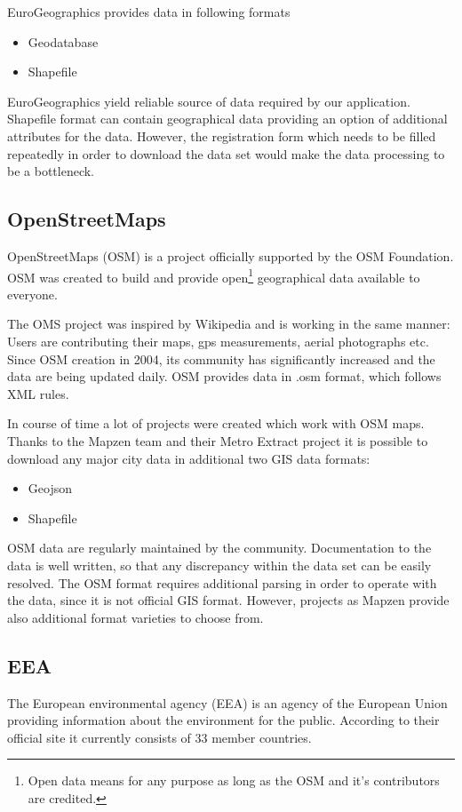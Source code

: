 \documentclass[thesis=M,english]{FITthesis}[2012/10/20]
\begin{document}
EuroGeographics provides data in following formats

\begin{itemize}
\item Geodatabase
\item Shapefile
\end{itemize}

EuroGeographics yield reliable source of data required by our application. Shapefile format can contain geographical data providing an option of additional attributes for the data. However, the registration form which needs to be filled repeatedly in order to download the data set would make the data processing to be a bottleneck.

\subsection{OpenStreetMaps}
\label{subsec:DA_OSM}
OpenStreetMaps (OSM) is a project officially supported by the OSM Foundation.
OSM was created to build and provide open\footnote{Open data means for any purpose as long as the OSM and it's contributors are credited.} geographical data available to everyone.  

The OMS project was inspired by Wikipedia and is working in the same manner: Users are contributing their maps, gps measurements, aerial photographs etc. Since OSM creation in 2004, its community has significantly increased and the data are being updated daily.
OSM provides data in .osm format, which follows XML rules.

In course of time a lot of projects were created which work with OSM maps.
Thanks to the Mapzen team and their Metro Extract project it is possible to download any major city data in additional two GIS data formats:
\begin{itemize}
\item Geojson
\item Shapefile
\end{itemize}

OSM data are regularly maintained by the community. Documentation to the data is well written, so that any discrepancy within the data set can be easily resolved. The OSM format requires additional parsing in order to operate with the data, since it is not official GIS format. However, projects as Mapzen provide also additional format varieties to choose from.

\subsection{EEA}
The European environmental agency (EEA) is an agency of the European Union providing information about the environment for the public. According to their official site \cite{EEA16} it currently consists of 33 member countries.
\end{document}
